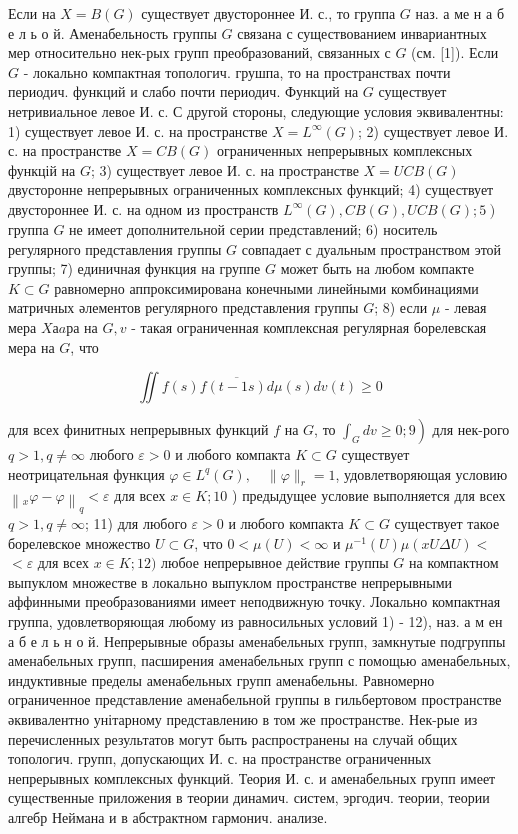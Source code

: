 \documentclass[10pt]{article}
\begin{document}
Если на $X=B(G)$ существует двустороннее И. с., то группа $G$ наз. а ме н а б е л ь о й. Аменабельность группы $G$ связана с существованием инвариантных мер относительно нек-рых групп преобразований, связанных с $G$ (см. [1]). Если $G$ - локально компактная топологич. грушпа, то на пространствах почти периодич. функций и слабо почти периодич. Функций на $G$ существует нетривиальное левое И. с. С другой стороны, следующие условия эквивалентны: 1) существует левое И. с. на пространстве $X=L^{\infty}(G)$; 2) существует левое И. с. на пространстве $X=C B(G)$ ограниченных непрерывных комплексных функцій на $G$; 3) существует левое И. с. на пространстве $X=U C B(G)$ двусторонне непрерывных ограниченных комплексных функций; 4) существует двустороннее И. с. на одном из пространств $\left.L^{\infty}(G), C B(G), U C B(G) ; 5\right)$ группа $G$ не имеет дополнительной серии представлений; 6) носитель регулярного представления группы $G$ совпадает с дуальным пространством этой группы; 7) единичная функция на группе $G$ может быть на любом компакте $K \subset G$ равномерно аппроксимирована конечными линейными комбинациями матричных әлементов регулярного представления группы $G$; 8) если $\mu$ - левая мера $X а a р а$ на $G, v$ - такая ограниченная комплексная регулярная борелевская мера на $G$, что



\[

\iint f(s) f \overline{(t-1 s)} d \mu(s) d v(t) \geqslant 0

\]



для всех финитных непрерывных функций $f$ на $G$, то $\left.\int_{G} d v \geqslant 0 ; 9\right)$ для нек-рого $q>1, q \neq \infty$ любого $\varepsilon>0$ и любого компакта $K \subset G$ существует неотрицательная функция $\varphi \in L^{q}(G), \quad\|\varphi\|_{r}=1$, удовлетворяющая условию $\left\|_{x} \varphi-\varphi\right\|_{q}<\varepsilon$ для всех $x \in K ; 10$ ) предыдущее условие выполняется для всех $q>1, q \neq \infty$; 11) для любого $\varepsilon>0$ и любого компакта $K \subset G$ существует такое борелевское множество $U \subset G$, что $0<\mu(U)<\infty$ и $\mu^{-1}(U) \mu(x U \Delta U)<$ $<\varepsilon$ для всех $x \in K ; 12)$ любое непрерывное действие группы $G$ на компактном выпуклом множестве в локально выпуклом пространстве непрерывными аффинными преобразованиями имеет неподвижную точку. Локально компактная группа, удовлетворяющая любому из равносильных условий 1) - 12), наз. а м ен а б е л ь н о й. Непрерывные образы аменабельных групп, замкнутые подгруппы аменабельных групп, пасширения аменабельных групп с помощью аменабельных, индуктивные пределы аменабельных групп аменабельны. Равномерно ограниченное представление аменабельной группы в гильбертовом пространстве әквивалентно унітарному представлению в том же пространстве. Нек-рые из перечисленных результатов могут быть распространены на случай общих топологич. групп, допускающих И. с. на пространстве ограниченных непрерывных комплексных функций. Теория И. с. и аменабельных групп имеет существенные приложения в теории динамич. систем, эргодич. теории, теории алгебр Неймана и в абстрактном гармонич. анализе.
\end{document}
